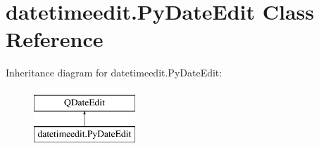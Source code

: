 \hypertarget{classdatetimeedit_1_1PyDateEdit}{}\section{datetimeedit.\+Py\+Date\+Edit Class Reference}
\label{classdatetimeedit_1_1PyDateEdit}
Inheritance diagram for datetimeedit.\+Py\+Date\+Edit\+:\begin{figure}[H]
\begin{center}
\leavevmode
\includegraphics[height=2.000000cm]{classdatetimeedit_1_1PyDateEdit}
\end{center}
\end{figure}
